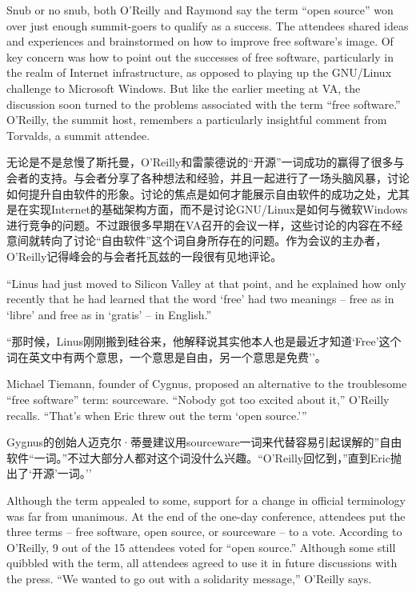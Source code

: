\ifdefined\eng
Snub or no snub, both O'Reilly and Raymond say the term ``open source'' won over just enough summit-goers to qualify as a success. The attendees shared ideas and experiences and brainstormed on how to improve free software's image. Of key concern was how to point out the successes of free software, particularly in the realm of Internet infrastructure, as opposed to playing up the GNU/Linux challenge to Microsoft Windows. But like the earlier meeting at VA, the discussion soon turned to the problems associated with the term ``free software.'' O'Reilly, the summit host, remembers a particularly insightful comment from Torvalds, a summit attendee.
\fi

\ifdefined\chs
无论是不是怠慢了斯托曼，O'Reilly和雷蒙德说的``开源''一词成功的赢得了很多与会者的支持。与会者分享了各种想法和经验，并且一起进行了一场头脑风暴，讨论如何提升自由软件的形象。讨论的焦点是如何才能展示自由软件的成功之处，尤其是在实现Internet的基础架构方面，而不是讨论GNU/Linux是如何与微软Windows进行竞争的问题。不过跟很多早期在VA召开的会议一样，这些讨论的内容在不经意间就转向了讨论``自由软件''这个词自身所存在的问题。作为会议的主办者，O'Reilly记得峰会的与会者托瓦兹的一段很有见地评论。
\fi

\ifdefined\eng
``Linus had just moved to Silicon Valley at that point, and he explained how only recently that he had learned that the word `free' had two meanings -- free as in `libre' and free as in `gratis' -- in English.''
\fi

\ifdefined\chs
``那时候，Linus刚刚搬到硅谷来，他解释说其实他本人也是最近才知道`Free'这个词在英文中有两个意思，一个意思是自由，另一个意思是免费''。
\fi

\ifdefined\eng
Michael Tiemann, founder of Cygnus, proposed an alternative to the troublesome ``free software'' term: sourceware. ``Nobody got too excited about it,'' O'Reilly recalls. ``That's when Eric threw out the term `open source.'\hspace{0.01in}''
\fi

\ifdefined\chs
Gygnus的创始人迈克尔·蒂曼建议用sourceware一词来代替容易引起误解的''自由软件``一词。''不过大部分人都对这个词没什么兴趣。``O'Reilly回忆到，''直到Eric抛出了`开源'一词。''
\fi

\ifdefined\eng
Although the term appealed to some, support for a change in official terminology was far from unanimous. At the end of the one-day conference, attendees put the three terms -- free software, open source, or sourceware -- to a vote. According to O'Reilly, 9 out of the 15 attendees voted for ``open source.'' Although some still quibbled with the term, all attendees agreed to use it in future discussions with the press. ``We wanted to go out with a solidarity message,'' O'Reilly says.
\fi

